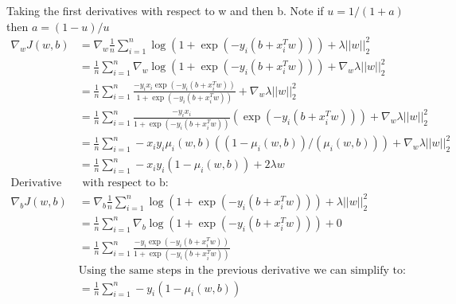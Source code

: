 \documentclass{article}
\newcommand{\1}{\mathbf{1}}
\begin{document}
Taking the first derivatives with respect to w and then b. Note if $u = 1/(1+a)$ then $a=(1-u)/u$
\begin{align*}
\nabla_w J(w,b) &  = \nabla_w \frac{1}{n} \sum_{i=1}^n \log( 1 + \exp(-y_i (b + x_i^T w))) + \lambda ||w||_2^2 \\
    &  = \frac{1}{n} \sum_{i=1}^n \nabla_w \log( 1 + \exp(-y_i (b + x_i^T w))) + \nabla_w \lambda ||w||_2^2 \\
    &  = \frac{1}{n} \sum_{i=1}^n \frac{- y_i x_i \exp(-y_i (b + x_i^T w)) }{ 1 + \exp(-y_i (b + x_i^T w))} + \nabla_w \lambda ||w||_2^2 \\
    &  = \frac{1}{n} \sum_{i=1}^n \frac{- y_i x_i}{ 1 + \exp(-y_i (b + x_i^T w))}   \left( \exp(-y_i (b + x_i^T w))  \right)  + \nabla_w \lambda ||w||_2^2 \\
    &  = \frac{1}{n} \sum_{i=1}^n - x_i y_i   \mu_i(w,b)   \left( (1- \mu_i(w,b))/( \mu_i(w,b))  \right)  + \nabla_w \lambda ||w||_2^2 \\
    &  = \frac{1}{n} \sum_{i=1}^n  -x_i y_i  \left( 1 - \mu_i(w,b) \right)  + 2\lambda w \\
\text{Derivative} & \text{ with respect to b:} \\    
\nabla_b J(w,b) &  = \nabla_b \frac{1}{n} \sum_{i=1}^n \log( 1 + \exp(-y_i (b + x_i^T w))) + \lambda ||w||_2^2 \\
    &  = \frac{1}{n} \sum_{i=1}^n \nabla_b \log( 1 + \exp(-y_i (b + x_i^T w))) + 0 \\
    &  = \frac{1}{n} \sum_{i=1}^n \frac{- y_i \exp(-y_i (b + x_i^T w)) }{ 1 + \exp(-y_i (b + x_i^T w))} \\
    & \text{Using the same steps in the previous derivative we can simplify to: } \\
    &  = \frac{1}{n} \sum_{i=1}^n  -y_i  \left( 1 - \mu_i(w,b) \right)  \\
\end{align*} 
\end{document}
